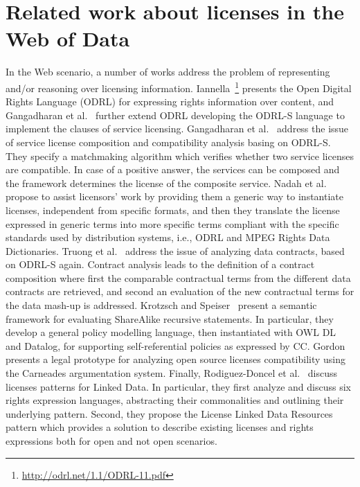 \section{Related work about licenses in the Web of Data}
\label{sec:soalicense}
In the Web scenario, a number of works address the problem of representing and/or reasoning over licensing information. Iannella~\footnote{\url{http://odrl.net/1.1/ODRL-11.pdf}} presents the Open Digital Rights Language (ODRL) for expressing rights information over content, and Gangadharan et al.~\cite{ODRLS} further extend ODRL developing the ODRL-S language to implement the clauses of service licensing.
%
Gangadharan et al.~\cite{DBLP:conf/icsoc/GangadharanWDI07} address the issue of service license composition and compatibility analysis basing on ODRL-S. They specify a matchmaking algorithm which verifies whether two service licenses are compatible. In case of a positive answer, the services can be composed and the framework determines the license of the composite service.
%
Nadah et al.~\cite{DBLP:conf/icail/NadahRB07} propose to assist licensors' work by providing them a generic way to instantiate licenses, independent from specific formats, and then they translate the license expressed in generic terms into more specific terms compliant with the specific standards used by distribution systems, i.e., ODRL and MPEG Rights Data Dictionaries.
%
Truong et al.~\cite{DBLP:conf/apscc/TruongGCDP11} address the issue of analyzing data contracts, based on ODRL-S again. Contract analysis leads to the definition of a contract composition where first the comparable contractual terms from the different data contracts are retrieved, and second an evaluation of the new contractual terms for the data mash-up is addressed.
%
Krotzsch and Speiser~\cite{DBLP:conf/semweb/KrotzschS11} present a semantic framework for evaluating ShareAlike recursive statements. In particular, they develop a general policy modelling language, then instantiated with OWL DL and Datalog, for supporting self-referential policies as expressed by CC.
%
Gordon~\cite{DBLP:conf/icail/Gordon11} presents a legal prototype for analyzing open source licenses compatibility using the Carneades argumentation system.
%
Finally, Rodiguez-Doncel et al.~\cite{victorPatterns2013a,victorPatterns2013b} discuss licenses patterns for Linked Data. In particular, they first analyze and discuss six rights expression languages, abstracting their commonalities and outlining their underlying pattern. Second, they propose the License Linked Data Resources pattern which provides a solution to describe existing licenses and rights expressions both for open and not open scenarios.
